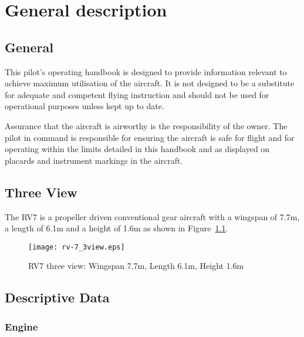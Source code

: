 \chapter{General description}
\thispagestyle{fancy}
\minitoc[n] %

\section{General}
This pilot's operating handbook is designed  to provide information relevant to achieve maximum utilisation 
of the aircraft.  It is not designed to be a substitute for adequate and competent flying instruction 
and should not be used for operational purposes unless kept up to date.

Assurance that the aircraft is airworthy is the responsibility of the owner.  The pilot in command is responsible for
ensuring the aircraft is safe for flight and for operating within the limits detailed in this handbook and as displayed on placards and instrument markings in the aircraft.

\section{Three View}
The RV7 is a propeller driven conventional gear aircraft with a wingspan of 7.7m, a length of 6.1m and a height of 1.6m as shown in Figure~\ref{fig:rv-7_3view}.

\begin{figure}[H]
\centering
\texttt{[image: rv-7\_3view.eps]}
\caption{RV7 three view: Wingspan 7.7m, Length 6.1m, Height 1.6m}
\label{fig:rv-7_3view}
\end{figure}

\section{Descriptive Data}
\subsection{Engine}

